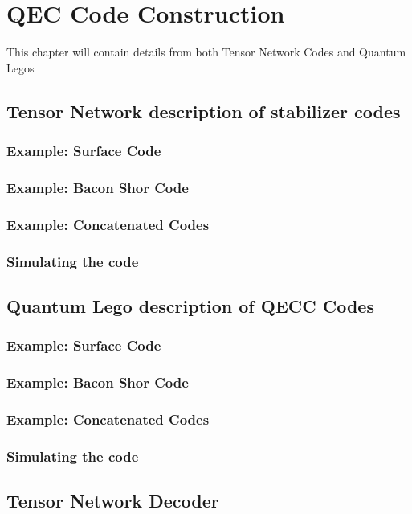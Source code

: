 \chapter[]{QEC Code Construction}

This chapter will contain details from both Tensor Network Codes and Quantum Legos
\section{Tensor Network description of stabilizer codes}


\subsection{Example: Surface Code}

\subsection{Example: Bacon Shor Code}


\subsection{Example: Concatenated Codes}

\subsection{Simulating the code}

\section{Quantum Lego description of QECC Codes}


\subsection{Example: Surface Code}

\subsection{Example: Bacon Shor Code}


\subsection{Example: Concatenated Codes}

\subsection{Simulating the code}

\section{Tensor Network Decoder}


